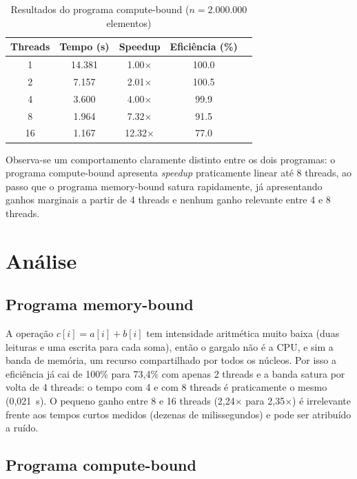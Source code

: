 \documentclass[a4paper,12pt]{article}
\begin{document}
\begin{table}[h]
    \centering
    \caption{Resultados do programa compute-bound ($n = 2.000.000$ elementos)}
    \label{tab:compute}
    \begin{tabular}{ccccc}
        \toprule
        Threads & Tempo (s) & Speedup & Eficiência (\%) \\
        \midrule
        1  & 14.381 & 1.00$\times$  & 100.0 \\
        2  & 7.157  & 2.01$\times$  & 100.5 \\
        4  & 3.600  & 4.00$\times$  & 99.9  \\
        8  & 1.964  & 7.32$\times$  & 91.5  \\
        16 & 1.167  & 12.32$\times$ & 77.0  \\
        \bottomrule
    \end{tabular}
\end{table}

Observa-se um comportamento claramente distinto entre os dois programas:
o programa compute-bound apresenta \emph{speedup} praticamente linear até 8
threads, ao passo que o programa memory-bound satura rapidamente, já
apresentando ganhos marginais a partir de 4 threads e nenhum ganho relevante
entre 4 e 8 threads.

\section{Análise}
\label{sec:analise}

\subsection{Programa memory-bound}

A operação $c[i] = a[i] + b[i]$ tem intensidade aritmética muito baixa
(duas leituras e uma escrita para cada soma), então o gargalo não é a CPU, e
sim a banda de memória, um recurso compartilhado por todos os núcleos. Por
isso a eficiência já cai de 100\% para 73{,}4\% com apenas 2 threads e a
banda satura por volta de 4 threads: o tempo com 4 e com 8 threads é
praticamente o mesmo (0{,}021~s). O pequeno ganho entre 8 e 16 threads
(2{,}24$\times$ para 2{,}35$\times$) é irrelevante frente aos tempos curtos
medidos (dezenas de milissegundos) e pode ser atribuído a ruído.

\subsection{Programa compute-bound}
\end{document}
